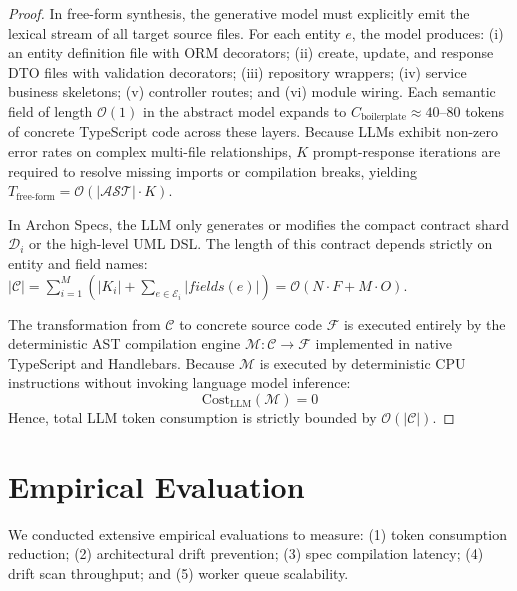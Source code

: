 \begin{proof}
In free-form synthesis, the generative model must explicitly emit the lexical stream of all target source files. For each entity $e$, the model produces: (i) an entity definition file with ORM decorators; (ii) create, update, and response DTO files with validation decorators; (iii) repository wrappers; (iv) service business skeletons; (v) controller routes; and (vi) module wiring. Each semantic field of length $\mathcal{O}(1)$ in the abstract model expands to $C_{\text{boilerplate}} \approx 40\text{--}80$ tokens of concrete TypeScript code across these layers. Because LLMs exhibit non-zero error rates on complex multi-file relationships, $K$ prompt-response iterations are required to resolve missing imports or compilation breaks, yielding $T_{\text{free-form}} = \mathcal{O}(|\mathcal{AST}| \cdot K)$.

In Archon Specs, the LLM only generates or modifies the compact contract shard $\mathcal{D}_i$ or the high-level UML DSL. The length of this contract depends strictly on entity and field names: $|\mathcal{C}| = \sum_{i=1}^M (|K_i| + \sum_{e \in \mathcal{E}_i} |fields(e)|) = \mathcal{O}(N \cdot F + M \cdot O)$. 

The transformation from $\mathcal{C}$ to concrete source code $\mathcal{F}$ is executed entirely by the deterministic AST compilation engine $\mathcal{M}: \mathcal{C} \to \mathcal{F}$ implemented in native TypeScript and Handlebars. Because $\mathcal{M}$ is executed by deterministic CPU instructions without invoking language model inference:
\begin{equation}
  \text{Cost}_{\text{LLM}}(\mathcal{M}) = 0
\end{equation}
Hence, total LLM token consumption is strictly bounded by $\mathcal{O}(|\mathcal{C}|)$.
\end{proof}

\section{Empirical Evaluation}
\label{sec:evaluation}

We conducted extensive empirical evaluations to measure: (1) token consumption reduction; (2) architectural drift prevention; (3) spec compilation latency; (4) drift scan throughput; and (5) worker queue scalability.

